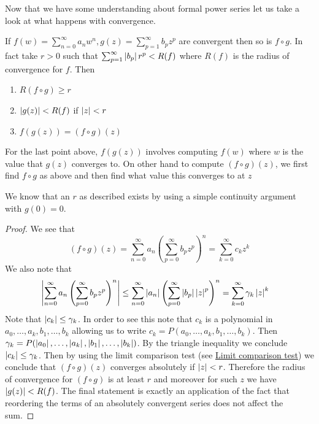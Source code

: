 Now that we have some understanding about formal power series let us take a look at what happens with convergence.
\begin{proposition}
If $f(w) = \sum_{n = 0}^\infty a_n w^n, g(z) = \sum_{p = 1}^\infty b_p z^p$ are convergent then so is $f \circ g$. In fact take $r > 0$ such that $\sum_{p = 1}^\infty \left|b_p\right| r^p < R(f)$ where $R(f)$ is the radius of convergence for $f$. Then
\begin{enumerate}
    \item $R(f \circ g) \geq r$
    \item $\left|g(z)\right| < R(f)$ if $\left|z\right| < r$
    \item $f(g(z)) = (f \circ g)(z)$
\end{enumerate}
\end{proposition}
\begin{remark}
For the last point above, $f(g(z))$ involves computing $f(w)$ where $w$ is the value that $g(z)$ converges to. On other hand to compute $(f \circ g)(z)$, we first find $f \circ g$ as above and then find what value this converges to at $z$
\end{remark}
\begin{remark}
We know that an $r$ as described exists by using a simple continuity argument with $g(0) = 0$.
\end{remark}
\begin{proof}
We see that
$$ (f \circ g)(z) = \sum_{n = 0}^\infty a_n \left( \sum_{p = 0}^\infty b_p z^p \right)^n = \sum_{k = 0}^\infty c_k z^k $$
We also note that
\begin{align*}
    \left|\sum_{n = 0}^\infty a_n \left( \sum_{p = 0}^\infty b_p z^p \right)^n\right| &\leq \sum_{n = 0}^\infty \left|a_n\right| \left( \sum_{p = 0}^\infty \left|b_p\right| \left|z\right|^p \right)^n = \sum_{k = 0}^\infty \gamma_k \left|z\right|^k
\end{align*}
Note that $\left|c_k\right| \leq \gamma_k$. In order to see this note that $c_k$ is a polynomial in $a_0, \dots, a_k, b_1, \dots, b_k$ allowing us to write $c_k = P(a_0, \dots, a_k, b_1, \dots, b_k)$. Then $\gamma_k = P(\left|a_0\right|, \dots, \left|a_k\right|, \left|b_1\right|, \dots, \left|b_k\right|)$. By the triangle inequality we conclude $\left|c_k\right| \leq \gamma_k$. Then by using the limit comparison test (see \href{https://en.wikipedia.org/wiki/Limit_comparison_test#One-sided_version}{Limit comparison test}) we conclude that $(f \circ g)(z)$ converges absolutely if $\left|z\right| < r$. Therefore the radius of convergence for $(f \circ g)$ is at least $r$ and moreover for such $z$ we have $\left|g(z)\right| < R(f)$. The final statement is exactly an application of the fact that reordering the terms of an absolutely convergent series does not affect the sum.
\end{proof}

